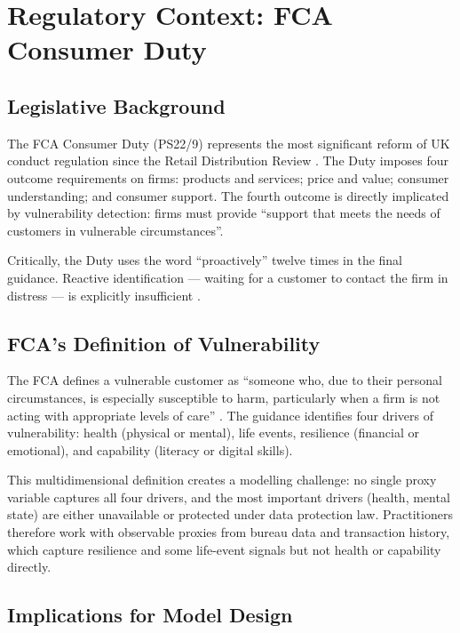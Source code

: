 \documentclass[12pt, a4paper]{article}
\begin{document}
\section{Regulatory Context: FCA Consumer Duty}

\subsection{Legislative Background}

The FCA Consumer Duty (PS22/9) represents the most significant reform of UK conduct
regulation since the Retail Distribution Review \cite{fca2022ps229}.
The Duty imposes four outcome requirements on firms: products and services;
price and value; consumer understanding; and consumer support.
The fourth outcome is directly implicated by vulnerability detection: firms must
provide ``support that meets the needs of customers in vulnerable circumstances''.

Critically, the Duty uses the word ``proactively'' twelve times in the final guidance.
Reactive identification --- waiting for a customer to contact the firm in distress ---
is explicitly insufficient \cite{fca2023vulnerable}.

\subsection{FCA's Definition of Vulnerability}

The FCA defines a vulnerable customer as ``someone who, due to their personal
circumstances, is especially susceptible to harm, particularly when a firm is not
acting with appropriate levels of care'' \cite{fg2120}.
The guidance identifies four drivers of vulnerability: health (physical or mental),
life events, resilience (financial or emotional), and capability (literacy or
digital skills).

This multidimensional definition creates a modelling challenge: no single proxy
variable captures all four drivers, and the most important drivers (health, mental
state) are either unavailable or protected under data protection law.
Practitioners therefore work with observable proxies from bureau data and
transaction history, which capture resilience and some life-event signals
but not health or capability directly.

\subsection{Implications for Model Design}
\end{document}
